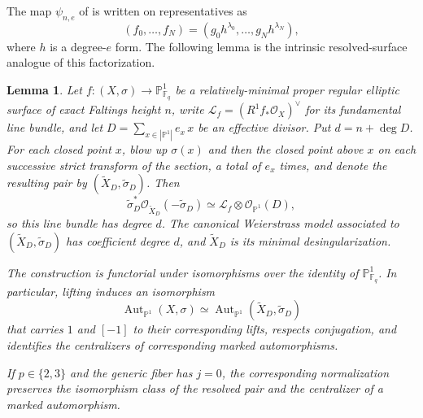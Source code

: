 \documentclass[a4paper,12pt]{amsart}
\newtheorem{lem}[thm]{Lemma}
\theoremstyle{definition}
\newcommand{\Fb}{\mathbb{F}}
\newcommand{\Pb}{\mathbb{P}}
\newcommand{\Aut}{\operatorname{Aut}}
\begin{document}
The map $\psi_{n,e}$ of \cite[Section~6.1 and Proposition~6.1]{BPS} is written on representatives as
\[
(f_0,\ldots,f_N)=(g_0h^{\lambda_0},\ldots,g_Nh^{\lambda_N}),
\]
where $h$ is a degree-$e$ form.  The following lemma is the intrinsic resolved-surface analogue of this factorization.

\begin{lem}
\label{lem:blowup-weierstrass}
Let $f\colon(X,\sigma)\to\Pb^1_{\Fb_q}$ be a relatively-minimal proper regular elliptic surface of exact Faltings height $n$, write $\mathcal L_f=(R^1f_*\mathcal O_X)^\vee$ for its fundamental line bundle, and let $D=\sum_{x\in|\Pb^1|}e_x\,x$ be an effective divisor.  Put $d=n+\deg D$.  For each closed point $x$, blow up $\sigma(x)$ and then the closed point above $x$ on each successive strict transform of the section, a total of $e_x$ times, and denote the resulting pair by $(\widetilde X_D,\widetilde\sigma_D)$.  Then
\begin{equation}\label{eq:blowup-conormal}
\widetilde\sigma_D^*\mathcal O_{\widetilde X_D}(-\widetilde\sigma_D)
\simeq
\mathcal L_f\otimes\mathcal O_{\Pb^1}(D),
\end{equation}
so this line bundle has degree $d$.  The canonical Weierstrass model associated to $(\widetilde X_D,\widetilde\sigma_D)$ has coefficient degree $d$, and $\widetilde X_D$ is its minimal desingularization.

The construction is functorial under isomorphisms over the identity of $\Pb^1_{\Fb_q}$.  In particular, lifting induces an isomorphism
\[
\Aut_{\Pb^1}(X,\sigma)
\simeq
\Aut_{\Pb^1}(\widetilde X_D,\widetilde\sigma_D)
\]
that carries $1$ and $[-1]$ to their corresponding lifts, respects conjugation, and identifies the centralizers of corresponding marked automorphisms.

If $p\in\{2,3\}$ and the generic fiber has $j=0$, the corresponding normalization preserves the isomorphism class of the resolved pair and the centralizer of a marked automorphism.
\end{lem}
\end{document}
